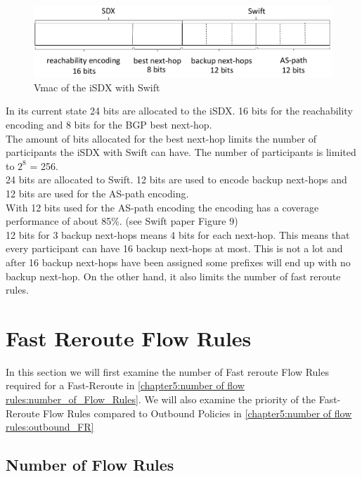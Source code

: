 \begin{figure}[h]
\center
\includegraphics[scale = 0.65]{Figures/eval_vmac_cropped2.pdf}
\caption{Vmac of the iSDX with Swift}
\end{figure}

In its current state 24 bits are allocated to the iSDX. 16 bits for the reachability encoding and 8 bits for the BGP best next-hop. \\
The amount of bits allocated for the best next-hop limits the number of participants the iSDX with Swift can have. The number of participants is limited to $2^8$ = 256. \\
24 bits are allocated to Swift. 12 bits are used to encode backup next-hops and 12 bits are used for the AS-path encoding. \\
With 12 bits used for the AS-path encoding the encoding has a coverage performance of about 85\%. (see Swift paper Figure 9)\\
12 bits for 3 backup next-hops means 4 bits for each next-hop. This means that every participant can have 16 backup next-hops at most. This is not a lot and after 16 backup next-hops have been assigned some prefixes will end up with no backup next-hop. On the other hand, it also limits the number of fast reroute rules. \\


\section{\label{chapter5:number of flow rules}Fast Reroute Flow Rules}

In this section we will first examine the number of Fast reroute Flow Rules required for a Fast-Reroute in \ref{chapter5:number of flow rules:number_of_Flow_Rules}. We will also examine the priority of the Fast-Reroute Flow Rules compared to Outbound Policies in \ref{chapter5:number of flow rules:outbound_FR}

\subsection{\label{chapter5:number of flow rules:number_of_Flow_Rules}Number of Flow Rules}

